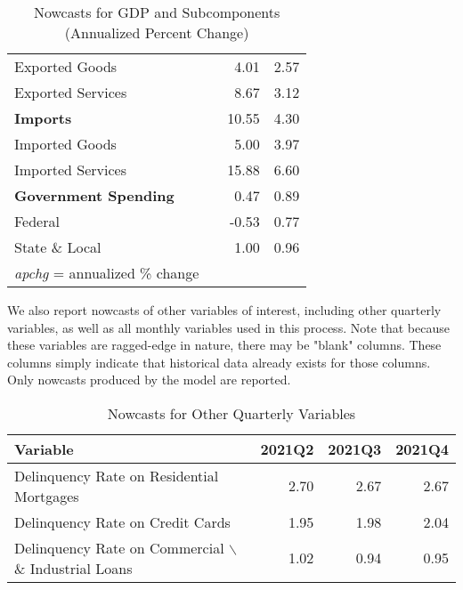 \documentclass[11pt, letterpaper]{article}\usepackage[]{graphicx}\usepackage[]{color}
\begin{document}
\begin{table}[H]
\begin{tabular}{lrrr}
  \hspace{8mm}  Exported Goods &  & 4.01 & 2.57 \\ 
  \hspace{8mm}  Exported Services &  & 8.67 & 3.12 \\ 
  \hspace{0mm} \textbf{Imports} &  & 10.55 & 4.30 \\ 
  \hspace{8mm}  Imported Goods &  & 5.00 & 3.97 \\ 
  \hspace{8mm}  Imported Services &  & 15.88 & 6.60 \\ 
  \hspace{0mm} \textbf{Government Spending} &  & 0.47 & 0.89 \\ 
  \hspace{8mm}  Federal &  & -0.53 & 0.77 \\ 
  \hspace{8mm}  State \& Local &  & 1.00 & 0.96 \\ 
   \hline 
 \textit{apchg} = annualized \% change 
\end{tabular}
\endgroup
\caption{Nowcasts for GDP and Subcomponents (Annualized Percent Change)} 
\end{table}


We also report nowcasts of other variables of interest, including other quarterly variables, as well as all monthly variables used in this process. Note that because these variables are ragged-edge in nature, there may be "blank" columns. These columns simply indicate that historical data already exists for those columns. Only nowcasts produced by the model are reported.
\begin{table}[H]
\centering
\begingroup\fontsize{11pt}{13pt}\selectfont
\begin{tabular}{lrrr}
  \hline
Variable & 2021Q2 & 2021Q3 & 2021Q4 \\ 
  \hline
Delinquency Rate on Residential Mortgages & 2.70 & 2.67 & 2.67 \\ 
  Delinquency Rate on Credit Cards & 1.95 & 1.98 & 2.04 \\ 
  Delinquency Rate on Commercial $\backslash$\& Industrial Loans & 1.02 & 0.94 & 0.95 \\ 
   \hline
\end{tabular}
\endgroup
\caption{Nowcasts for Other Quarterly Variables} 
\end{table}
\end{document}
